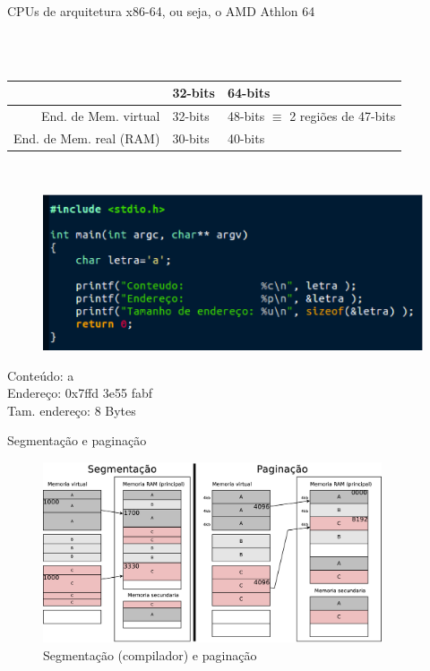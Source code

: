 \documentclass[envcountsect,dvips]{beamer}
\begin{document}
\begin{frame}
CPUs de arquitetura x86-64, ou seja, o AMD Athlon 64 \cite{AMD64}

~\\
~\\

\begin{tabular}{r | l | l}
~                & 32-bits & 64-bits\\
\hline \hline
 End. de Mem. virtual   & 32-bits & 48-bits $\equiv$ 2 regiões de 47-bits\\ 
 \hline  
 End. de Mem. real (RAM)& 30-bits & 40-bits \cite{AMD64}\\
 \hline 
\end{tabular}

~\\

\begin{minipage}{6cm}
\begin{figure}
\centering
\includegraphics[width=\textwidth]{cfiles/test.eps}
\label{fig:test1}
\end{figure}
\end{minipage}
\begin{minipage}{4.5cm}
Conteúdo: a\\
Endereço: 0x7ffd 3e55 fabf\\
Tam. endereço: 8 Bytes
\end{minipage}

\end{frame}


\begin{frame}{Segmentação e paginação}
\begin{figure}
\centering
\includegraphics[width=10cm]{images/segmentpage.eps}
\caption{Segmentação (compilador) e paginação}
\label{fig:segmentpage}
\end{figure}
\end{frame}
\end{document}
